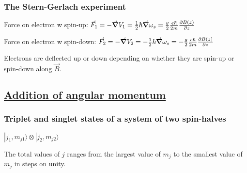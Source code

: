 \subsubsection{The Stern-Gerlach experiment} \hfill

Force on electron w spin-up: $\vec{F}_1 = -\vec{\grad} V_1 = \frac{1}{2} \hbar \vec{\grad} \omega_s = \frac{g}{2} \frac{e \hbar}{2m} \pdv{B(z)}{z}$

Force on electron w spin-down: $\vec{F}_2 = -\vec{\grad} V_2 = -\frac{1}{2} \hbar \vec{\grad} \omega_s = - \frac{g}{2} \frac{e \hbar}{2m} \pdv{B(z)}{z}$

Electrons are deflected up or down depending on whether they are spin-up or spin-down along $\vec{B}$.

\subsection{\underline{Addition of angular momentum}}

\subsubsection{Triplet and singlet states of a system of two spin-halves}

$| j_1, m_{j1} \rangle \otimes | j_2, m_{j2} \rangle$


The total values of $j$ ranges from the largest value of $m_j$ to the smallest value of $m_j$ in steps on unity. 


